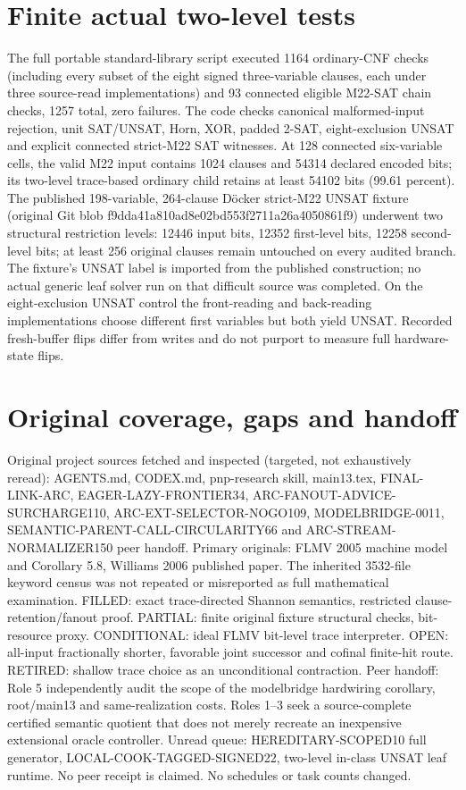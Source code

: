 \documentclass[11pt]{article}
\begin{document}
\section{Finite actual two-level tests}
The full portable standard-library script executed 1164 ordinary-CNF checks (including every subset of the eight signed three-variable clauses, each under three source-read implementations) and 93 connected eligible M22-SAT chain checks, 1257 total, zero failures. The code checks canonical malformed-input rejection, unit SAT/UNSAT, Horn, XOR, padded 2-SAT, eight-exclusion UNSAT and explicit connected strict-M22 SAT witnesses.
At 128 connected six-variable cells, the valid M22 input contains 1024 clauses and 54314 declared encoded bits; its two-level trace-based ordinary child retains at least 54102 bits (99.61 percent). The published 198-variable, 264-clause Döcker strict-M22 UNSAT fixture (original Git blob f9dda41a810ad8e02bd553f2711a26a4050861f9) underwent two structural restriction levels: 12446 input bits, 12352 first-level bits, 12258 second-level bits; at least 256 original clauses remain untouched on every audited branch. The fixture's UNSAT label is imported from the published construction; no actual generic leaf solver run on that difficult source was completed.
On the eight-exclusion UNSAT control the front-reading and back-reading implementations choose different first variables but both yield UNSAT. Recorded fresh-buffer flips differ from writes and do not purport to measure full hardware-state flips.

\section{Original coverage, gaps and handoff}
Original project sources fetched and inspected (targeted, not exhaustively reread): AGENTS.md, CODEX.md, pnp-research skill, main13.tex, FINAL-LINK-ARC, EAGER-LAZY-FRONTIER34, ARC-FANOUT-ADVICE-SURCHARGE110, ARC-EXT-SELECTOR-NOGO109, MODELBRIDGE-0011, SEMANTIC-PARENT-CALL-CIRCULARITY66 and ARC-STREAM-NORMALIZER150 peer handoff. Primary originals: FLMV 2005 machine model and Corollary 5.8, Williams 2006 published paper. The inherited 3532-file keyword census was not repeated or misreported as full mathematical examination.
FILLED: exact trace-directed Shannon semantics, restricted clause-retention/fanout proof. PARTIAL: finite original fixture structural checks, bit-resource proxy. CONDITIONAL: ideal FLMV bit-level trace interpreter. OPEN: all-input fractionally shorter, favorable joint successor and cofinal finite-hit route. RETIRED: shallow trace choice as an unconditional contraction.
Peer handoff: Role 5 independently audit the scope of the modelbridge hardwiring corollary, root/main13 and same-realization costs. Roles 1--3 seek a source-complete certified semantic quotient that does not merely recreate an inexpensive extensional oracle controller. Unread queue: HEREDITARY-SCOPED10 full generator, LOCAL-COOK-TAGGED-SIGNED22, two-level in-class UNSAT leaf runtime. No peer receipt is claimed. No schedules or task counts changed.
\end{document}
